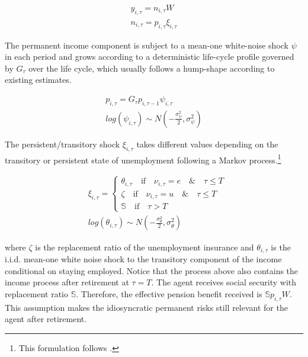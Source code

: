 \begin{equation}
\begin{split}
y_{i,\tau} = n_{i,\tau}W \\ 
n_{i,\tau} = p_{i,\tau}\xi_{i,\tau}
\end{split}
\end{equation}

The permanent income component is subject to a mean-one white-noise shock $\psi$ in each period and grows according to a deterministic life-cycle profile governed by $G_\tau$ over the life cycle, which usually follows a hump-shape according to existing estimates. \citep{gourinchas2002consumption}

\begin{equation}
\begin{split}
p_{i,\tau} = G_\tau p_{i,\tau-1}\psi_{i,\tau} \\
log (\psi_{i,\tau}) \sim N(-\frac{\sigma^2_{\psi}}{2},\sigma^2_{\psi})
\end{split}
\end{equation}

The persistent/transitory shock $\xi_{i,\tau}$ takes different values depending on the transitory or persistent state of unemployment following a Markov process.\footnote{This formulation follows \cite{krueger2016macroeconomics}.}  

\begin{equation}
\begin{split}
& \xi_{i,\tau} =   \left\{
\begin{array}{ll}
 \theta_{i,\tau} \quad \text{if} \quad \nu_{i,\tau} =e \quad \& \quad  \tau \leq T \\
      \zeta \quad \text{if} \quad \nu_{i,\tau} = u \quad \& \quad \tau \leq T  \\
      \mathbb{S} \quad \text{if}  \quad \tau > T
\end{array} \right. \\
& log(\theta_{i,\tau}) \sim N(-\frac{\sigma^2_\theta}{2},\sigma^2_\theta)
\end{split}
\end{equation}

where $\zeta$ is the replacement ratio of the unemployment insurance and $\theta_{i,\tau}$ is the i.i.d. mean-one white noise shock to the transitory component of the income conditional on staying employed. Notice that the process above also contains the income process after retirement at $\tau=T$. The agent receives social security with replacement ratio $\mathbb{S}$. Therefore, the effective pension benefit received is $\mathbb{S}p_{i,\tau}W$. This assumption makes the idiosyncratic permanent risks still relevant for the agent after retirement. 

